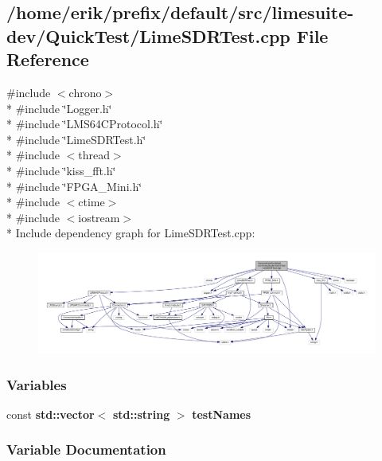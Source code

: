 \subsection{/home/erik/prefix/default/src/limesuite-\/dev/\+Quick\+Test/\+Lime\+S\+D\+R\+Test.cpp File Reference}
\label{LimeSDRTest_8cpp}
{\ttfamily \#include $<$chrono$>$}\\*
{\ttfamily \#include \char`\"{}Logger.\+h\char`\"{}}\\*
{\ttfamily \#include \char`\"{}L\+M\+S64\+C\+Protocol.\+h\char`\"{}}\\*
{\ttfamily \#include \char`\"{}Lime\+S\+D\+R\+Test.\+h\char`\"{}}\\*
{\ttfamily \#include $<$thread$>$}\\*
{\ttfamily \#include \char`\"{}kiss\+\_\+fft.\+h\char`\"{}}\\*
{\ttfamily \#include \char`\"{}F\+P\+G\+A\+\_\+\+Mini.\+h\char`\"{}}\\*
{\ttfamily \#include $<$ctime$>$}\\*
{\ttfamily \#include $<$iostream$>$}\\*
Include dependency graph for Lime\+S\+D\+R\+Test.\+cpp\+:
\nopagebreak
\begin{figure}[H]
\begin{center}
\leavevmode
\includegraphics[width=350pt]{da/d1a/LimeSDRTest_8cpp__incl}
\end{center}
\end{figure}
\subsubsection*{Variables}
\begin{DoxyCompactItemize}
\item 
const {\bf std\+::vector}$<$ {\bf std\+::string} $>$ {\bf test\+Names}
\end{DoxyCompactItemize}


\subsubsection{Variable Documentation}
